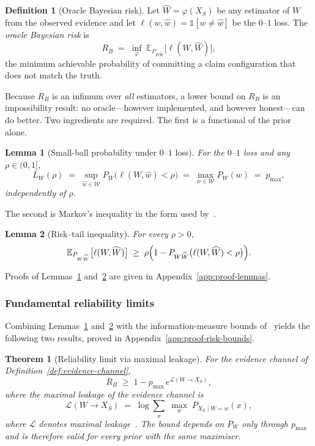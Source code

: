 \documentclass[journal]{IEEEtran}
\newtheorem{theorem}{Theorem}
\newtheorem{lemma}{Lemma}
\theoremstyle{definition}
\newtheorem{definition}{Definition}
\theoremstyle{remark}
\begin{document}
\begin{definition}[Oracle Bayesian risk]
\label{def:bayes-risk}
Let $\widehat{W}=\varphi(X_S)$ be any estimator of $W$ from
the observed evidence and let
$\ell(w,\hat{w})=\mathbb{1}[w\neq\hat{w}]$ be the $0$--$1$
loss. The \emph{oracle Bayesian risk} is
\[
  R_B \;=\; \inf_{\varphi}\;
  \mathbb{E}_{P_{W\widehat{W}}}
  \bigl[\ell(W,\widehat{W})\bigr],
\]
the minimum achievable probability of committing a claim
configuration that does not match the truth.
\end{definition}

Because $R_B$ is an infimum over \emph{all} estimators, a
lower bound on $R_B$ is an impossibility result: no
oracle---however implemented, and however honest---can do
better. Two ingredients are required. The first is a
functional of the prior alone.

\begin{lemma}[Small-ball probability under $0$--$1$ loss]
\label{lem:smallball}
For the $0$--$1$ loss and any $\rho\in(0,1]$,
\[
  L_W(\rho)
  \;=\; \sup_{\hat{w}\in\mathcal{W}}
        P_W\bigl(\ell(W,\hat{w})<\rho\bigr)
  \;=\; \max_{w\in\mathcal{W}} P_W(w)
  \;=\; p_{\max},
\]
independently of $\rho$.
\end{lemma}

The second is Markov's inequality in the form used
by~\cite{esposito2024lower}.

\begin{lemma}[Risk--tail inequality]
\label{lem:markov}
For every $\rho>0$,
\[
  \mathbb{E}_{P_{W\widehat{W}}}\bigl[\ell(W,\widehat{W})\bigr]
  \;\geq\;
  \rho\Bigl(
    1-P_{W\widehat{W}}\bigl(\ell(W,\widehat{W})<\rho\bigr)
  \Bigr).
\]
\end{lemma}

Proofs of Lemmas~\ref{lem:smallball}
and~\ref{lem:markov} are given in
Appendix~\ref{app:proof-lemmas}.

\subsubsection{Fundamental reliability limits}

Combining Lemmas~\ref{lem:smallball} and~\ref{lem:markov}
with the information-measure bounds
of~\cite{esposito2024lower} yields the following two
results, proved in
Appendix~\ref{app:proof-risk-bounds}.

\begin{theorem}[Reliability limit via maximal leakage]
\label{thm:risk-ml}
For the evidence channel of
Definition~\ref{def:evidence-channel},
\[
  R_B \;\geq\; 1 - p_{\max}\,e^{\mathcal{L}(W\to X_S)},
\]
where the maximal leakage of the evidence channel is
\[
  \mathcal{L}(W\to X_S)
  \;=\; \log\sum_{x}\;\max_{w}\;P_{X_S\mid W=w}(x),
\]
where $\mathcal{L}$ denotes maximal
leakage~\cite{esposito2024lower}. The bound depends on
$P_W$ only through $p_{\max}$ and is therefore valid for
every prior with the same maximiser.
\end{theorem}
\end{document}
